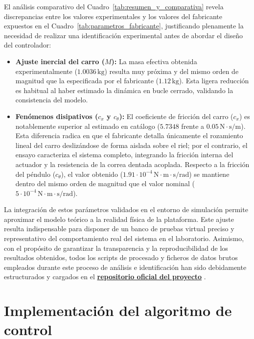 \documentclass[11pt,fleqn]{book} %
\begin{document}
El análisis comparativo del Cuadro~\ref{tab:resumen_y_comparativa} revela discrepancias entre los valores experimentales y los valores del fabricante expuestos en el Cuadro~\ref{tab:parametros_fabricante}, justificando plenamente la necesidad de realizar una identificación experimental antes de abordar el diseño del controlador:
\begin{itemize}
	\item \textbf{Ajuste inercial del carro ($M$):} La masa efectiva obtenida experimentalmente ($1.0036\,\mathrm{kg}$) resulta muy próxima y del mismo orden de magnitud que la especificada por el fabricante ($1.12\,\mathrm{kg}$). Esta ligera reducción es habitual al haber estimado la dinámica en bucle cerrado, validando la consistencia del modelo.
	
	\item \textbf{Fenómenos disipativos ($c_x$ y $c_\theta$):} El coeficiente de fricción del carro ($c_x$) es notablemente superior al estimado en catálogo ($5.7348$ frente a $0.05\,\mathrm{N\cdot s/m}$). Esta diferencia radica en que el fabricante detalla únicamente el rozamiento lineal del carro deslizándose de forma aislada sobre el riel; por el contrario, el ensayo caracteriza el sistema completo, integrando la fricción interna del actuador y la resistencia de la correa dentada acoplada. Respecto a la fricción del péndulo ($c_\theta$), el valor obtenido ($1.91 \cdot 10^{-4}\,\mathrm{N\cdot m\cdot s/rad}$) se mantiene dentro del mismo orden de magnitud que el valor nominal ($5 \cdot 10^{-4}\,\mathrm{N\cdot m\cdot s/rad}$).
	
\end{itemize}

La integración de estos parámetros validados en el entorno de simulación permite aproximar el modelo teórico a la realidad física de la plataforma. Este ajuste resulta indispensable para disponer de un banco de pruebas virtual preciso y representativo del comportamiento real del sistema en el laboratorio. Asimismo, con el propósito de garantizar la transparencia y la reproducibilidad de los resultados obtenidos, todos los scripts de procesado y ficheros de datos brutos empleados durante este proceso de análisis e identificación han sido debidamente estructurados y cargados en el \href{https://github.com/MPV247/TFG_Control_MiguelPorcar}{\textbf{repositorio oficial del proyecto}} \cite{Porcar2026TFG}.

\newpage
\section{Implementación del algoritmo de control}
\label{sec:implementacion_algoritmo}
\end{document}
